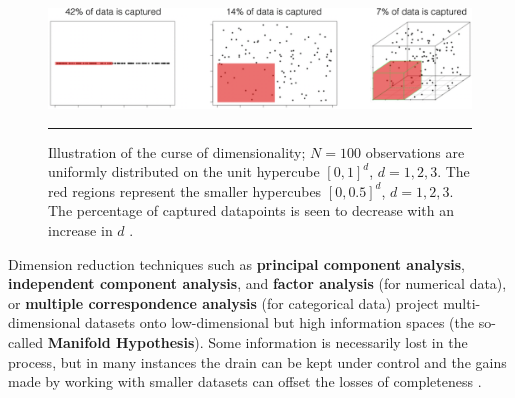 \begin{figure}[t]
\centering
\includegraphics[width=\textwidth]{Images/COD.png}\caption[\small Illustration of the curse of dimensionality]{\small Illustration of the curse of dimensionality; $N=100$ observations are uniformly distributed on the unit hypercube $[0,1]^d$, $d=1, 2, 3$. The red regions represent the smaller hypercubes $[0,0.5]^d$, $d=1,2,3$. The percentage of captured datapoints is seen to decrease with an increase in $d$ \cite{DP_SS}.} \label{fig:COD}\hrule
\end{figure}
Dimension reduction techniques such as \textbf{principal component analysis}, \textbf{independent component analysis}, and \textbf{factor analysis} (for numerical data), or \textbf{multiple correspondence analysis} (for categorical data) project multi-dimensional datasets onto low-dimensional but high information spaces (the so-called \textbf{Manifold Hypothesis}). Some information is necessarily lost in the process, but in many instances the drain can be kept under control and the gains made by working with smaller datasets can offset the losses of completeness \cite{DAL_FSDR}.
